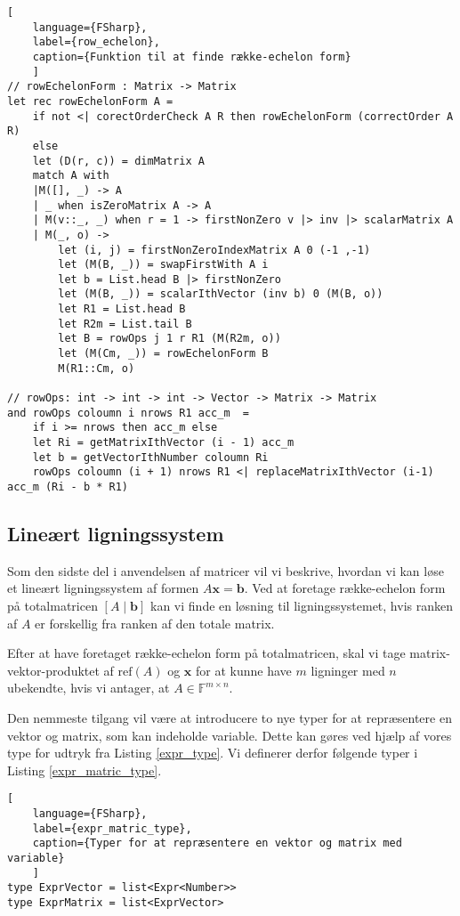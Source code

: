 \begin{lstlisting}[
    language={FSharp}, 
    label={row_echelon}, 
    caption={Funktion til at finde række-echelon form}
    ]
// rowEchelonForm : Matrix -> Matrix
let rec rowEchelonForm A = 
    if not <| corectOrderCheck A R then rowEchelonForm (correctOrder A R)
    else
    let (D(r, c)) = dimMatrix A
    match A with
    |M([], _) -> A
    | _ when isZeroMatrix A -> A
    | M(v::_, _) when r = 1 -> firstNonZero v |> inv |> scalarMatrix A  
    | M(_, o) ->
        let (i, j) = firstNonZeroIndexMatrix A 0 (-1 ,-1)
        let (M(B, _)) = swapFirstWith A i
        let b = List.head B |> firstNonZero
        let (M(B, _)) = scalarIthVector (inv b) 0 (M(B, o))
        let R1 = List.head B
        let R2m = List.tail B
        let B = rowOps j 1 r R1 (M(R2m, o))
        let (M(Cm, _)) = rowEchelonForm B
        M(R1::Cm, o)

// rowOps: int -> int -> int -> Vector -> Matrix -> Matrix  
and rowOps coloumn i nrows R1 acc_m  =
    if i >= nrows then acc_m else
    let Ri = getMatrixIthVector (i - 1) acc_m
    let b = getVectorIthNumber coloumn Ri
    rowOps coloumn (i + 1) nrows R1 <| replaceMatrixIthVector (i-1) acc_m (Ri - b * R1)
\end{lstlisting}

\subsection{Lineært ligningssystem}\label{sec:lin_eq}
Som den sidste del i anvendelsen af matricer vil vi beskrive, hvordan vi kan løse et lineært ligningssystem af formen \(A \mathbf{x} = \mathbf{b}\). Ved at foretage række-echelon form på totalmatricen \(\left[ A \mid \mathbf{b} \right]\) kan vi finde en løsning til ligningssystemet, hvis ranken af \(A\) er forskellig fra ranken af den totale matrix. 

Efter at have foretaget række-echelon form på totalmatricen, skal vi tage matrix-vektor-produktet af \(\text{ref}(A)\) og \(\mathbf{x}\) for at kunne have \(m\) ligninger med \(n\) ubekendte, hvis vi antager, at \(A \in \mathbb{F}^{m \times n}\).

Den nemmeste tilgang vil være at introducere to nye typer for at repræsentere en vektor og matrix, som kan indeholde variable. Dette kan gøres ved hjælp af vores type for udtryk fra Listing \ref{expr_type}. Vi definerer derfor følgende typer i Listing \ref{expr_matric_type}.

\begin{lstlisting}[
    language={FSharp}, 
    label={expr_matric_type}, 
    caption={Typer for at repræsentere en vektor og matrix med variable}
    ]
type ExprVector = list<Expr<Number>>
type ExprMatrix = list<ExprVector>
\end{lstlisting}


